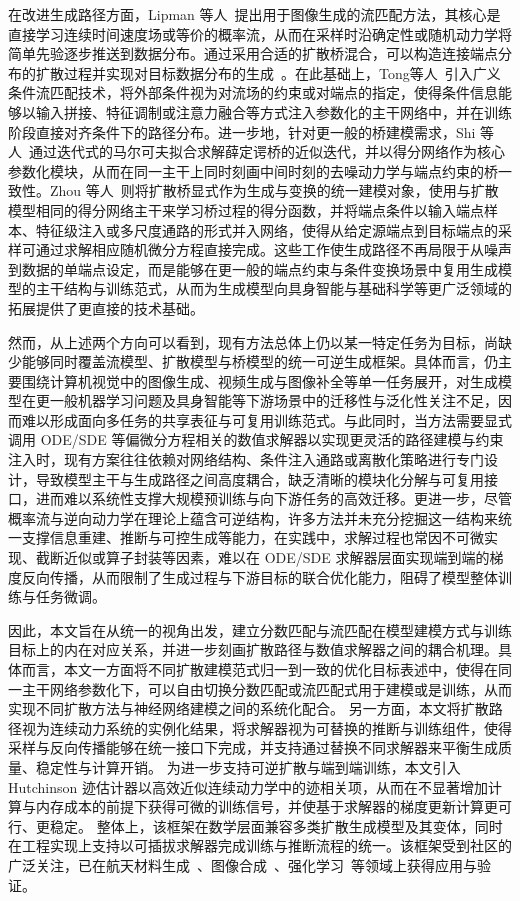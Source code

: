 在改进生成路径方面，Lipman 等人~\cite{lipman2022flow}提出用于图像生成的流匹配方法，其核心是直接学习连续时间速度场或等价的概率流，从而在采样时沿确定性或随机动力学将简单先验逐步推送到数据分布。通过采用合适的扩散桥混合，可以构造连接端点分布的扩散过程并实现对目标数据分布的生成~\cite{peluchetti2023non}。在此基础上，Tong等人~\cite{tong2023improving}引入广义条件流匹配技术，将外部条件视为对流场的约束或对端点的指定，使得条件信息能够以输入拼接、特征调制或注意力融合等方式注入参数化的主干网络中，并在训练阶段直接对齐条件下的路径分布。进一步地，针对更一般的桥建模需求，Shi 等人~\cite{shi2023diffusion}通过迭代式的马尔可夫拟合求解薛定谔桥的近似迭代，并以得分网络作为核心参数化模块，从而在同一主干上同时刻画中间时刻的去噪动力学与端点约束的桥一致性。Zhou 等人~\cite{zhou2024denoising}则将扩散桥显式作为生成与变换的统一建模对象，使用与扩散模型相同的得分网络主干来学习桥过程的得分函数，并将端点条件以输入端点样本、特征级注入或多尺度通路的形式并入网络，使得从给定源端点到目标端点的采样可通过求解相应随机微分方程直接完成。这些工作使生成路径不再局限于从噪声到数据的单端点设定，而是能够在更一般的端点约束与条件变换场景中复用生成模型的主干结构与训练范式，从而为生成模型向具身智能与基础科学等更广泛领域的拓展提供了更直接的技术基础。

然而，从上述两个方向可以看到，现有方法总体上仍以某一特定任务为目标，尚缺少能够同时覆盖流模型、扩散模型与桥模型的统一可逆生成框架。具体而言，仍主要围绕计算机视觉中的图像生成、视频生成与图像补全等单一任务展开，对生成模型在更一般机器学习问题及具身智能等下游场景中的迁移性与泛化性关注不足，因而难以形成面向多任务的共享表征与可复用训练范式。与此同时，当方法需要显式调用 ODE/SDE 等偏微分方程相关的数值求解器以实现更灵活的路径建模与约束注入时，现有方案往往依赖对网络结构、条件注入通路或离散化策略进行专门设计，导致模型主干与生成路径之间高度耦合，缺乏清晰的模块化分解与可复用接口，进而难以系统性支撑大规模预训练与向下游任务的高效迁移。更进一步，尽管概率流与逆向动力学在理论上蕴含可逆结构，许多方法并未充分挖掘这一结构来统一支撑信息重建、推断与可控生成等能力，在实践中，求解过程也常因不可微实现、截断近似或算子封装等因素，难以在 ODE/SDE 求解器层面实现端到端的梯度反向传播，从而限制了生成过程与下游目标的联合优化能力，阻碍了模型整体训练与任务微调。

因此，本文旨在从统一的视角出发，建立分数匹配与流匹配在模型建模方式与训练目标上的内在对应关系，并进一步刻画扩散路径与数值求解器之间的耦合机理。具体而言，本文一方面将不同扩散建模范式归一到一致的优化目标表述中，使得在同一主干网络参数化下，可以自由切换分数匹配或流匹配式用于建模或是训练，从而实现不同扩散方法与神经网络建模之间的系统化配合。
另一方面，本文将扩散路径视为连续动力系统的实例化结果，将求解器视为可替换的推断与训练组件，使得采样与反向传播能够在统一接口下完成，并支持通过替换不同求解器来平衡生成质量、稳定性与计算开销。
为进一步支持可逆扩散与端到端训练，本文引入 Hutchinson 迹估计器以高效近似连续动力学中的迹相关项，从而在不显著增加计算与内存成本的前提下获得可微的训练信号，并使基于求解器的梯度更新计算更可行、更稳定。
整体上，该框架在数学层面兼容多类扩散生成模型及其变体，同时在工程实现上支持以可插拔求解器完成训练与推断流程的统一。该框架受到社区的广泛关注，已在航天材料生成~\cite{yang2024data,zhang2025funcgenfoil}、图像合成~\cite{Xue_2025_ICCV}、强化学习~\cite{zhang2024generative_rl}等领域上获得应用与验证。

